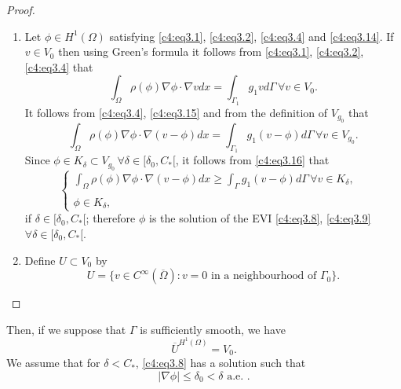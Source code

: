 \begin{proof}%
\begin{enumerate}[(1)]
\item Let $\phi \in H^1(\Omega)$ satisfying \eqref{c4:eq3.1}, \eqref{c4:eq3.2}, \eqref{c4:eq3.4} and \eqref{c4:eq3.14}. If $v \in V_0$ then using Green's formula it follows from \eqref{c4:eq3.1}, \eqref{c4:eq3.2}, \eqref{c4:eq3.4} that 
\begin{equation}
\int_\Omega \rho(\phi) \nabla \phi \cdot \nabla v dx = \int_{\Gamma_1} g_1 v d\Gamma\, \forall v \in V_0. \tag{3.15}\label{c4:eq3.15}
\end{equation}
It follows from \eqref{c4:eq3.4}, \eqref{c4:eq3.15} and from the definition of $V_{g_0}$ that 
\begin{equation}
\int_\Omega \rho (\phi) \nabla \phi \cdot \nabla (v-\phi) dx = \int_{\Gamma_{1}} g_1 (v-\phi) d \Gamma\, \forall v \in V_{g_0}. \tag{3.16}\label{c4:eq3.16}
\end{equation}
Since $\phi \in K_\delta \subset V_{g_0}\, \forall \delta \in [\delta_0, C_*[$, it follows from \eqref{c4:eq3.16} that 
\begin{equation*}
\begin{cases}
\int_\Omega \rho (\phi) \nabla \phi \cdot \nabla (v -\phi) dx \geq \int_\Gamma g_1 (v-\phi) d\Gamma\, \forall v \in K_\delta, \\
&\\
\phi \in K_\delta,
\end{cases}
\end{equation*}
if $\delta \in [\delta_0, C_*[$; therefore $\phi$ is the solution of the EVI \eqref{c4:eq3.8}, \eqref{c4:eq3.9} $\forall \delta \in [\delta_0, C_*[$.
\item Define $U \subset V_0$ by 
$$
U = \{v \in C^\infty (\overline{\Omega}) : v =0 \text{ in a neighbourhood of  }\Gamma_0\}.
$$
\end{enumerate}
\end{proof}
Then, if we suppose that $\Gamma$ is sufficiently smooth, we have 
\begin{equation}
\overline{U}^{H^1(\Omega)} = V_0. \tag{3.17}\label{c4:eq3.17}
\end{equation}
We assume that for $\delta < C_*$, \eqref{c4:eq3.8} has a solution such that 
\begin{equation}
|\nabla \phi| \leq \delta_0 < \delta \text{ a.e. }. \tag{3.18}\label{c4:eq3.18}
\end{equation}\pageoriginale 

